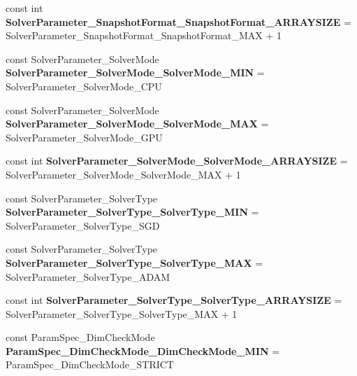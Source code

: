 \begin{DoxyCompactItemize}
const int {\bfseries Solver\+Parameter\+\_\+\+Snapshot\+Format\+\_\+\+Snapshot\+Format\+\_\+\+A\+R\+R\+A\+Y\+S\+I\+ZE} = Solver\+Parameter\+\_\+\+Snapshot\+Format\+\_\+\+Snapshot\+Format\+\_\+\+M\+AX + 1
\item 
\mbox{\label{namespacecaffe_aa68e70a093af00b4925f969ed2b3edaa}} 
const Solver\+Parameter\+\_\+\+Solver\+Mode {\bfseries Solver\+Parameter\+\_\+\+Solver\+Mode\+\_\+\+Solver\+Mode\+\_\+\+M\+IN} = Solver\+Parameter\+\_\+\+Solver\+Mode\+\_\+\+C\+PU
\item 
\mbox{\label{namespacecaffe_a281dc1e28c06d53c5b903fec1d4c158d}} 
const Solver\+Parameter\+\_\+\+Solver\+Mode {\bfseries Solver\+Parameter\+\_\+\+Solver\+Mode\+\_\+\+Solver\+Mode\+\_\+\+M\+AX} = Solver\+Parameter\+\_\+\+Solver\+Mode\+\_\+\+G\+PU
\item 
\mbox{\label{namespacecaffe_a059341d1d7c4a2be620876ed772acce8}} 
const int {\bfseries Solver\+Parameter\+\_\+\+Solver\+Mode\+\_\+\+Solver\+Mode\+\_\+\+A\+R\+R\+A\+Y\+S\+I\+ZE} = Solver\+Parameter\+\_\+\+Solver\+Mode\+\_\+\+Solver\+Mode\+\_\+\+M\+AX + 1
\item 
\mbox{\label{namespacecaffe_aa33c0ce2650e49332096f47cb31bffc3}} 
const Solver\+Parameter\+\_\+\+Solver\+Type {\bfseries Solver\+Parameter\+\_\+\+Solver\+Type\+\_\+\+Solver\+Type\+\_\+\+M\+IN} = Solver\+Parameter\+\_\+\+Solver\+Type\+\_\+\+S\+GD
\item 
\mbox{\label{namespacecaffe_a0afbfa1193ce10db9ce6ae13c466654d}} 
const Solver\+Parameter\+\_\+\+Solver\+Type {\bfseries Solver\+Parameter\+\_\+\+Solver\+Type\+\_\+\+Solver\+Type\+\_\+\+M\+AX} = Solver\+Parameter\+\_\+\+Solver\+Type\+\_\+\+A\+D\+AM
\item 
\mbox{\label{namespacecaffe_ae8df0260efa493e3e3ed3e6921073698}} 
const int {\bfseries Solver\+Parameter\+\_\+\+Solver\+Type\+\_\+\+Solver\+Type\+\_\+\+A\+R\+R\+A\+Y\+S\+I\+ZE} = Solver\+Parameter\+\_\+\+Solver\+Type\+\_\+\+Solver\+Type\+\_\+\+M\+AX + 1
\item 
\mbox{\label{namespacecaffe_ace7bbb5c518536d4724860295986eb0a}} 
const Param\+Spec\+\_\+\+Dim\+Check\+Mode {\bfseries Param\+Spec\+\_\+\+Dim\+Check\+Mode\+\_\+\+Dim\+Check\+Mode\+\_\+\+M\+IN} = Param\+Spec\+\_\+\+Dim\+Check\+Mode\+\_\+\+S\+T\+R\+I\+CT

\end{DoxyCompactItemize}
